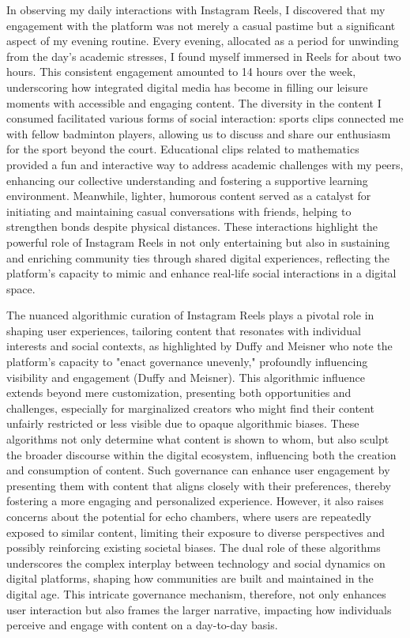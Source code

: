 \documentclass[12pt]{article}
\begin{document}
In observing my daily interactions with Instagram Reels, I discovered that my engagement with the platform was not merely a casual pastime but a significant aspect of my evening routine. Every evening, allocated as a period for unwinding from the day's academic stresses, I found myself immersed in Reels for about two hours. This consistent engagement amounted to 14 hours over the week, underscoring how integrated digital media has become in filling our leisure moments with accessible and engaging content. The diversity in the content I consumed facilitated various forms of social interaction: sports clips connected me with fellow badminton players, allowing us to discuss and share our enthusiasm for the sport beyond the court. Educational clips related to mathematics provided a fun and interactive way to address academic challenges with my peers, enhancing our collective understanding and fostering a supportive learning environment. Meanwhile, lighter, humorous content served as a catalyst for initiating and maintaining casual conversations with friends, helping to strengthen bonds despite physical distances. These interactions highlight the powerful role of Instagram Reels in not only entertaining but also in sustaining and enriching community ties through shared digital experiences, reflecting the platform's capacity to mimic and enhance real-life social interactions in a digital space.

The nuanced algorithmic curation of Instagram Reels plays a pivotal role in shaping user experiences, tailoring content that resonates with individual interests and social contexts, as highlighted by Duffy and Meisner who note the platform's capacity to "enact governance unevenly," profoundly influencing visibility and engagement (Duffy and Meisner). This algorithmic influence extends beyond mere customization, presenting both opportunities and challenges, especially for marginalized creators who might find their content unfairly restricted or less visible due to opaque algorithmic biases. These algorithms not only determine what content is shown to whom, but also sculpt the broader discourse within the digital ecosystem, influencing both the creation and consumption of content. Such governance can enhance user engagement by presenting them with content that aligns closely with their preferences, thereby fostering a more engaging and personalized experience. However, it also raises concerns about the potential for echo chambers, where users are repeatedly exposed to similar content, limiting their exposure to diverse perspectives and possibly reinforcing existing societal biases. The dual role of these algorithms underscores the complex interplay between technology and social dynamics on digital platforms, shaping how communities are built and maintained in the digital age. This intricate governance mechanism, therefore, not only enhances user interaction but also frames the larger narrative, impacting how individuals perceive and engage with content on a day-to-day basis.
\end{document}
